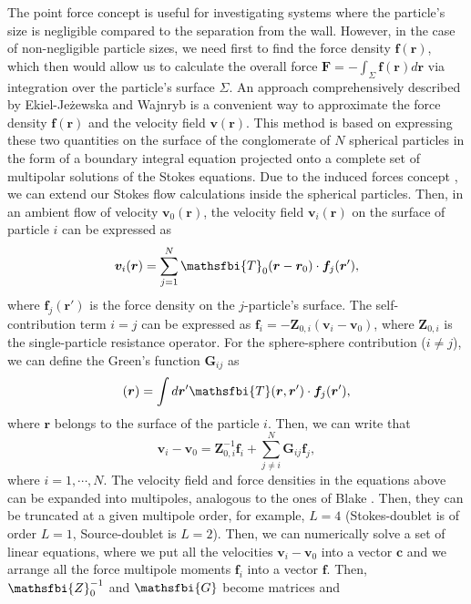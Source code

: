 \documentclass{master_thesis}
\begin{document}
The point force concept is useful for investigating systems where the particle's size is negligible compared to the separation from the wall. However, in the case of non-negligible particle sizes, we need first to find the force density $\boldsymbol{f}(\boldsymbol{r})$, which then would allow us to calculate the overall force $\boldsymbol{F}=-\int_\Sigma\boldsymbol{f}(\boldsymbol{r})d\boldsymbol{r}$ via integration over the particle's surface $\Sigma$. An approach comprehensively described by Ekiel-Jeżewska and Wajnryb \cite{ekiel_2009} is a convenient way to approximate the force density $\boldsymbol{f}(\boldsymbol{r})$ and the velocity field $\boldsymbol{v}(\boldsymbol{r})$. This method is based on expressing these two quantities on the surface of the conglomerate of $N$ spherical particles in the form of a boundary integral equation projected onto a complete set of multipolar solutions of the Stokes equations. Due to the induced forces concept \cite{albano_1975}, we can extend our Stokes flow calculations inside the spherical particles. Then, in an ambient flow of velocity $\boldsymbol{v}_0(\boldsymbol{r})$, the velocity field $\boldsymbol{v}_i(\boldsymbol{r})$ on the surface of particle $i$ can be expressed as
\begin{equation}
    \boldsymbol{v}_i(\boldsymbol{r}) = \sum_{j=1}^N \mathsfbi{T}_0(\boldsymbol{r} - \boldsymbol{r}_0) \cdot \boldsymbol{f}_j(\boldsymbol{r}'),
\label{eqn:stokeslet_velocity2}
\end{equation}
where $\boldsymbol{f}_j(\boldsymbol{r}')$ is the force density on the $j$-particle's surface. The self-contribution term $i=j$ can be expressed as $\boldsymbol{f}_i=-\boldsymbol{Z}_{0,i}(\boldsymbol{v}_i - \boldsymbol{v}_0)$, where $\boldsymbol{Z}_{0,i}$ is the single-particle resistance operator. For the sphere-sphere contribution ($i\neq j$), we can define the Green's function $\boldsymbol{G}_{ij}$ as
\begin{equation}
    [\boldsymbol{G}_{ij}\boldsymbol{f}_j](\boldsymbol{r}) = \int d\boldsymbol{r}' \mathsfbi{T}(\boldsymbol{r},\boldsymbol{r}') \cdot \boldsymbol{f}_j(\boldsymbol{r}'),
\end{equation}
where $\boldsymbol{r}$ belongs to the surface of the particle $i$. Then, we can write that
\begin{equation}
    \boldsymbol{v}_i - \boldsymbol{v}_0 = \boldsymbol{Z}_{0,i}^{-1} \boldsymbol{f}_i + \sum_{j \neq i}^{N} \boldsymbol{G}_{ij} \boldsymbol{f}_j,
\end{equation}
where $i=1, \cdots, N$. The velocity field and force densities in the equations above can be expanded into multipoles, analogous to the ones of Blake \cite{blake1971}. Then, they can be truncated at a given multipole order, for example, $L=4$ (Stokes-doublet is of order $L=1$, Source-doublet is $L=2$). Then, we can numerically solve a set of linear equations, where we put all the velocities $\boldsymbol{v}_i - \boldsymbol{v}_0$ into a vector $\boldsymbol{c}$ and we arrange all the force multipole moments $\boldsymbol{f}_i$ into a vector $\boldsymbol{f}$. Then, $\mathsfbi{Z}_{0}^{-1}$ and $\mathsfbi{G}$ become matrices and
\end{document}
